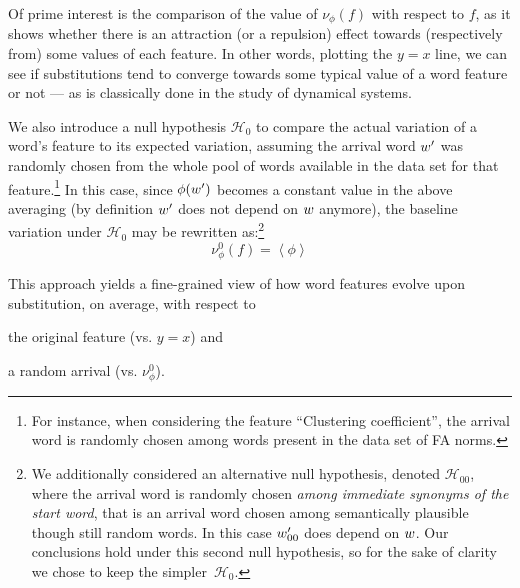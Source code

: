Of prime interest is the comparison of the value of $\nu_{\phi}(f)$ with respect to $f$, as it shows whether there is an attraction (or a repulsion) effect towards (respectively from) some values of each feature.
In other words, plotting the $y=x$ line, we can see if substitutions tend to converge towards some typical value of a word feature or not --- as is classically done in the study of dynamical systems.


We also introduce a null hypothesis $\mathcal{H}_0$ to compare the actual variation of a word's feature to its expected variation, assuming the arrival word $w'$ was randomly chosen from the whole pool of words available in the data set for that feature.\footnote{For instance, when considering the feature ``Clustering coefficient'', the arrival word is randomly chosen among words present in the data set of FA norms.}
In this case, since $\phi(w')$ becomes a constant value in the above averaging (by definition $w'$ does not depend on $w$ anymore),  the baseline variation under $\mathcal{H}_0$ may be rewritten as:\footnote{We additionally considered an alternative null hypothesis, denoted $\mathcal{H}_{00}$, where the arrival word is randomly chosen \emph{among immediate synonyms of the start word}, that is an arrival word chosen among semantically plausible though still random words. In this case $w'_{00}$ does depend on $w$. Our conclusions hold under this second null hypothesis, so for the sake of clarity we chose to keep the simpler~$\mathcal{H}_0$.}
$$\nu_{\phi}^0 (f) = \left<\phi\right>$$

This approach yields a fine-grained view of how word features evolve upon substitution, on average, with respect to
\begin{seriate}
\item the original feature (\hbox{vs.} $y=x$) and
\item a random arrival (\hbox{vs.} $\nu_{\phi}^0$).
\end{seriate}

\medskip


